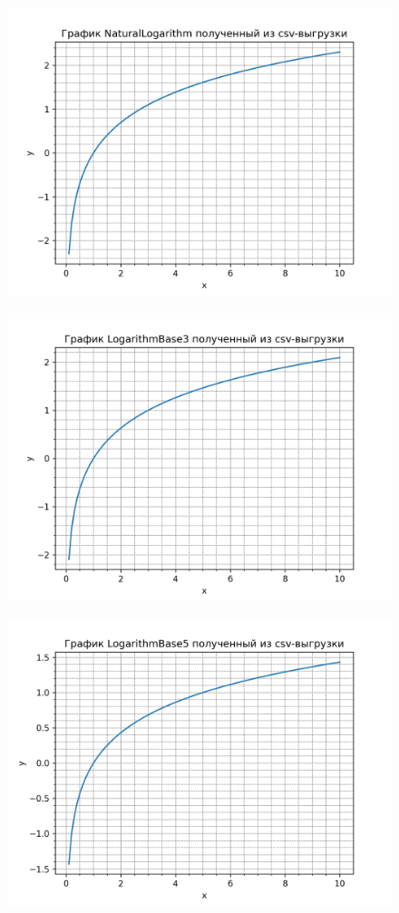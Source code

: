 \documentclass[12pt,onecolumn]{article}
\begin{document}
\begin{figure}[H]
    \centering
    \includegraphics[width=\textwidth]{image/NaturalLogarithm.png}
\end{figure}
\begin{figure}[H]
    \centering
    \includegraphics[width=\textwidth]{image/LogarithmBase3.png}
\end{figure}
\begin{figure}[H]
    \centering
    \includegraphics[width=\textwidth]{image/LogarithmBase5.png}
\end{figure}
\end{document}
